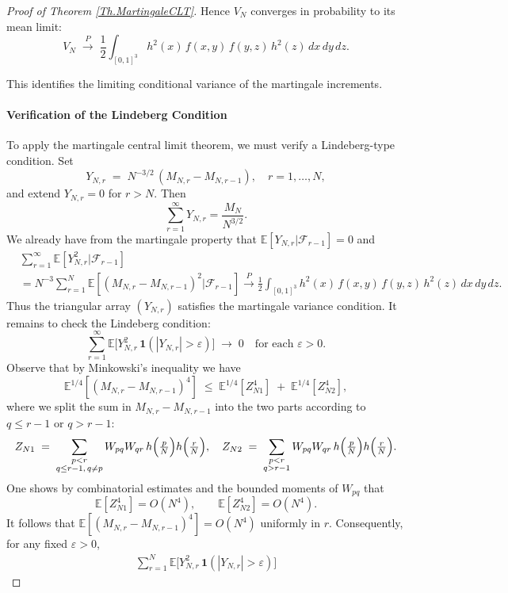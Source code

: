 \documentclass[11pt, reqno]{amsart}
\numberwithin{equation}{section}
\begin{document}
\begin{proof}[Proof of Theorem \ref{Th.MartingaleCLT}]

Hence $V_N$ converges in probability to its mean limit:
\[
V_N \;\xrightarrow{P}\; \frac12 \int_{[0,1]^3} h^2(x)\,f(x,y)\,f(y,z)\,h^2(z)\,dx\,dy\,dz.
\]

This identifies the limiting conditional variance of the martingale increments.

\paragraph{\bf Verification of the Lindeberg Condition}

To apply the martingale central limit theorem, we must verify a Lindeberg-type condition.  Set
\[
Y_{N,r} \;=\; N^{-3/2}\,(M_{N,r} - M_{N,r-1}),\quad r=1,\dots,N,
\]
and extend $Y_{N,r}=0$ for $r>N$.  Then
\[
\sum_{r=1}^\infty Y_{N,r} = \frac{M_N}{N^{3/2}}.
\]
We already have from the martingale property that $\mathbb{E}[Y_{N,r}|\mathcal{F}_{r-1}]=0$ and
\begin{align*}
&\sum_{r=1}^\infty \mathbb{E}[Y_{N,r}^2|\mathcal{F}_{r-1}] \\
&= N^{-3}\sum_{r=1}^N \mathbb{E}[(M_{N,r} - M_{N,r-1})^2|\mathcal{F}_{r-1}] 
\xrightarrow{P} 
\frac12\int_{[0,1]^3} h^2(x)\,f(x,y)\,f(y,z)\,h^2(z)\,dx\,dy\,dz.
\end{align*}
Thus the triangular array $(Y_{N,r})$ satisfies the martingale variance condition.  It remains to check the Lindeberg condition:
\[
\sum_{r=1}^\infty \mathbb{E}\bigl[Y_{N,r}^2 \,\mathbf{1}(|Y_{N,r}|>\varepsilon)\bigr] \;\to\; 0 
\quad\text{for each }\varepsilon>0.
\]
Observe that by Minkowski's inequality we have
\[
\mathbb{E}^{1/4}[(M_{N,r}-M_{N,r-1})^4]
\;\le\; \mathbb{E}^{1/4}[Z_{N1}^4] \;+\; \mathbb{E}^{1/4}[Z_{N2}^4],
\]
where we split the sum in $M_{N,r}-M_{N,r-1}$ into the two parts according to $q\le r-1$ or $q>r-1$:
\[
Z_{N1} \;=\; \sum_{\substack{p<r\\ q\le r-1,\,q\neq p}} W_{pq}W_{qr}\,h\Bigl(\tfrac{p}{N}\Bigr)h\Bigl(\tfrac{r}{N}\Bigr),
\quad
Z_{N2} \;=\; \sum_{\substack{p<r\\ q>r-1}} W_{pq}W_{qr}\,h\Bigl(\tfrac{p}{N}\Bigr)h\Bigl(\tfrac{r}{N}\Bigr).
\]
One shows by combinatorial estimates and the bounded moments of $W_{pq}$ that
\[
\mathbb{E}[Z_{N1}^4] = O(N^4), 
\qquad 
\mathbb{E}[Z_{N2}^4] = O(N^4).
\]
It follows that $\mathbb{E}[(M_{N,r}-M_{N,r-1})^4] = O(N^4)$ uniformly in $r$.  Consequently, for any fixed $\varepsilon>0$,
\[
\begin{aligned}
\sum_{r=1}^{N} \mathbb{E}\bigl[Y_{N,r}^2\,\mathbf{1}(|Y_{N,r}|>\varepsilon)\bigr]

\end{aligned}\]
\end{proof}
\end{document}
